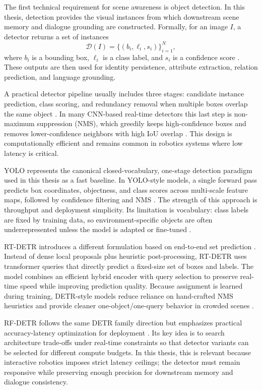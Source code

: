 The first technical requirement for scene awareness is object detection. In this thesis, detection provides the visual instances from which downstream scene memory and dialogue grounding are
constructed. Formally, for an image \(I\), a detector returns a set of instances
\[
\mathcal{D}(I)=\{(b_i,\ell_i,s_i)\}_{i=1}^{N},
\]
where \(b_i\) is a bounding box, \(\ell_i\) is a class label, and \(s_i\) is a confidence score \cite{foundationsCVbook}. These outputs are then used for identity persistence, attribute extraction,
relation prediction, and language grounding.

A practical detector pipeline usually includes three stages: candidate instance prediction, class scoring, and redundancy removal when multiple boxes overlap the same object \cite{foundationsCVbook}.
In many CNN-based real-time detectors this last step is non-maximum suppression (NMS), which greedily keeps high-confidence boxes and removes lower-confidence neighbors with high IoU overlap
\cite{hosang_learning_2017}. This design is computationally efficient and remains common in robotics systems where low latency is critical.

YOLO represents the canonical closed-vocabulary, one-stage detection paradigm used in this thesis as a fast baseline. In YOLO-style models, a single forward pass predicts box coordinates, objectness,
and class scores across multi-scale feature maps, followed by confidence filtering and NMS \cite{sapkota_ultralytics_2026}. The strength of this approach is throughput and deployment simplicity. Its
limitation is vocabulary: class labels are fixed by training data, so environment-specific objects are often underrepresented unless the model is adapted or fine-tuned
\cite{lin2015microsoftcococommonobjects}.

RT-DETR introduces a different formulation based on end-to-end set prediction \cite{zhao_detrs_2024}. Instead of dense local proposals plus heuristic post-processing, RT-DETR uses transformer queries
that directly predict a fixed-size set of boxes and labels. The model combines an efficient hybrid encoder with query selection to preserve real-time speed while improving prediction quality. Because
assignment is learned during training, DETR-style models reduce reliance on hand-crafted NMS heuristics and provide cleaner one-object/one-query behavior in crowded scenes \cite{zhao_detrs_2024}.

RF-DETR follows the same DETR family direction but emphasizes practical accuracy-latency optimization for deployment \cite{robinson_rf-detr_2026}. Its key idea is to search architecture trade-offs
under real-time constraints so that detector variants can be selected for different compute budgets. In this thesis, this is relevant because interactive robotics imposes strict latency ceilings; the
detector must remain responsive while preserving enough precision for downstream memory and dialogue consistency.

